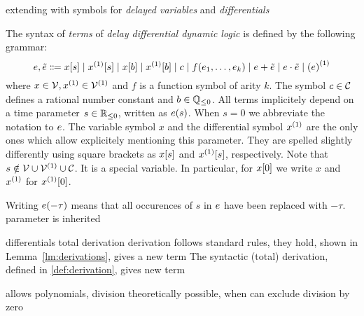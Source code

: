 extending \dL with symbols for \emph{delayed variables} and \emph{differentials}
    \begin{definition}[Terms]\label{def:syntax-terms}
        The syntax of \emph{terms} of \emph{delay differential dynamic logic} is defined by the following grammar:
        \begin{equation*}
            \astrm,\bstrm \Coloneqq
                \x[s] \mid
                \Dx[s] \mid
                \x[b] \mid
                \Dx[b] \mid
                c \mid
                f(\range{\istrm{1}}{\istrm{k}}) \mid
                \astrm + \bstrm \mid
                \astrm \cdot \bstrm \mid
                \D{(\astrm)}
        \end{equation*}
        where $x\in\allvars,\D{x}\in\diffvars$ and $f$ is a function symbol of arity $k$.
        The symbol $c\in\mathcal{C}_{}$ defines a rational number constant and $b\in\mathbb{Q}_{\leq 0}$.
        All terms implicitely depend on a time parameter $s\in\mathbb{R}_{\leq 0}$, written as $e(s)$. When $s=0$ we abbreviate the notation to $e$.
        The variable symbol $x$ and the differential symbol $\D{x}$ are the only ones which allow explicitely mentioning this parameter. They are spelled slightly differently using square brackets as $x[s]$ and $\Dx[s]$, respectively. Note that $s\notin\allvars\cup\diffvars\cup\constants$. It is a special variable.
        In particular, for $x[0]$ we write $x$ and $\D{x}$ for $\Dx[0]$.

        Writing $e(-\tau)$ means that all occurences of $s$ in $e$ have been replaced with $-\tau$.
        parameter is inherited

        differentials
        total derivation
        derivation follows standard rules, they hold, shown in Lemma~\ref{lm:derivations}, gives a new term
        The syntactic (total) derivation, defined in \ref{def:derivation}, gives new term

        allows polynomials,
        division theoretically possible, when can exclude division by zero

    \end{definition}

